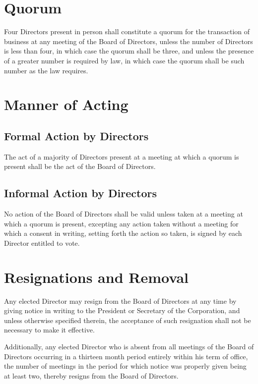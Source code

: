 \documentclass[12pt]{report}
\begin{document}
\section{Quorum}

Four Directors present in person shall constitute a quorum for the transaction of business at any meeting of the Board of Directors, unless the number of Directors is less than four, in which case the quorum shall be three, and unless the presence of a greater number is required by law, in which case the quorum shall be such number as the law requires.

\section{Manner of Acting}

\subsection{Formal Action by Directors}

The act of a majority of Directors present at a meeting at which a quorum is present shall be the act of the Board of Directors.

\subsection{Informal Action by Directors}

No action of the Board of Directors shall be valid unless taken at a meeting at which a quorum is present, excepting any action taken without a meeting for which a consent in writing, setting forth the action so taken, is signed by each Director entitled to vote.

\section{Resignations and Removal}

Any elected Director may resign from the Board of Directors at any time by giving notice in writing to the President or Secretary of the Corporation, and unless otherwise specified therein, the acceptance of such resignation shall not be necessary to make it effective.

Additionally, any elected Director who is absent from all meetings of the Board of Directors occurring in a thirteen month period entirely within his term of office, the number of meetings in the period for which notice was properly given being at least two, thereby resigns from the Board of Directors.
\end{document}
